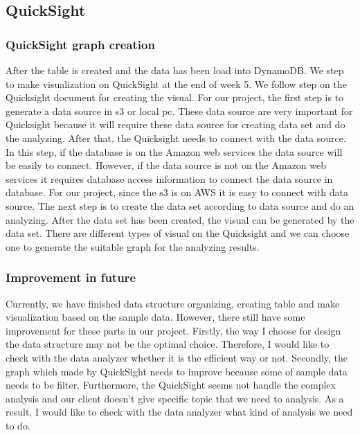 \subsection{QuickSight}
	\subsubsection{QuickSight graph creation}
    After the table is created and the data has been load into DynamoDB. We step to make visualization on QuickSight at the end of week 5. We follow step on the Quicksight document for creating the visual. For our project, the first step is to generate a data source in s3 or local pc. These data source are very important for Quicksight because it will require these data source for creating data set and do the analyzing. After that, the Quicksight needs to connect with the data source. In this step, if the database is on the Amazon web services the data source will be easily to connect. However, if the data source is not on the Amazon web services it requires database access information to connect the data source in database. For our project, since the s3 is on AWS it is easy to connect with data source. The next step is to create the data set according to data source and do an analyzing. After the data set has been created, the visual can be generated by the data set. There are different types of visual on the Quicksight and we can choose one to generate the suitable graph for the analyzing results.
	\subsubsection{Improvement in future}
    Currently, we have finished data structure organizing, creating table and make visualization based on the sample data. However, there still have some improvement for these parts in our project. Firstly, the way I choose for design the data structure may not be the optimal choice. Therefore, I would like to check with the data analyzer whether it is the efficient way or not. Secondly, the graph which made by QuickSight needs to improve because some of sample data needs to be filter. Furthermore, the QuickSight seems not handle the complex analysis and our client doesn’t give specific topic that we need to analysis. As a result, I would like to check with the data analyzer what kind of analysis we need to do.
